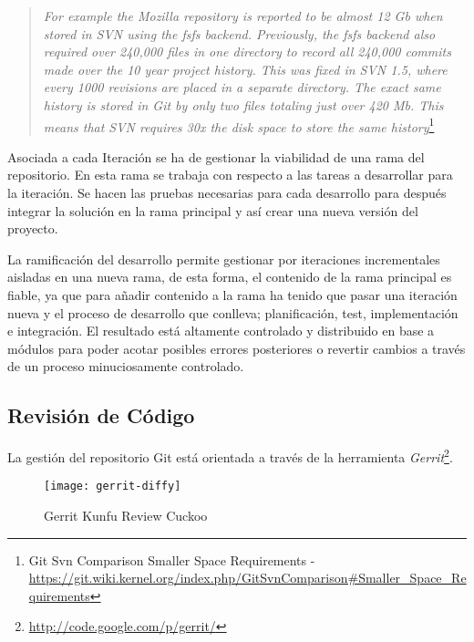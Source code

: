 \begin{quotation}
    \emph{For example the Mozilla repository is reported to be almost 12 Gb when stored in SVN using the fsfs backend. Previously, the fsfs backend also required over 240,000 files in one directory to record all 240,000 commits made over the 10 year project history. This was fixed in SVN 1.5, where every 1000 revisions are placed in a separate directory. The exact same history is stored in Git by only two files totaling just over 420 Mb. This means that SVN requires 30x the disk space to store the same history}\footnote{Git Svn Comparison Smaller Space Requirements - \url{https://git.wiki.kernel.org/index.php/GitSvnComparison\#Smaller\_Space\_Requirements}}
\end{quotation}

\par Asociada a cada Iteración se ha de gestionar la viabilidad de una rama del repositorio. En esta rama se trabaja con respecto a las tareas a desarrollar para la iteración. Se hacen las pruebas necesarias para cada desarrollo para después integrar la solución en la rama principal y así crear una nueva versión del proyecto. 

\par La ramificación del desarrollo permite gestionar por iteraciones incrementales aisladas en una nueva rama, de esta forma, el contenido de la rama principal es fiable, ya que para añadir contenido a la rama ha tenido que pasar una iteración nueva y el proceso de desarrollo que conlleva; planificación, test, implementación e integración. El resultado está altamente controlado y distribuido en base a módulos para poder acotar posibles errores posteriores o revertir cambios a través de un proceso minuciosamente controlado.


\subsection{Revisión de Código}
\label{sub:gerrit}

\par La gestión del repositorio Git está orientada a través de la herramienta \emph{Gerrit}\footnote{\url{http://code.google.com/p/gerrit/}}.

\begin{figure}[H]
    \centering
    \texttt{[image: gerrit-diffy]}
    \caption{Gerrit Kunfu Review Cuckoo}
    \label{fig:gerrit-logo}
\end{figure}

